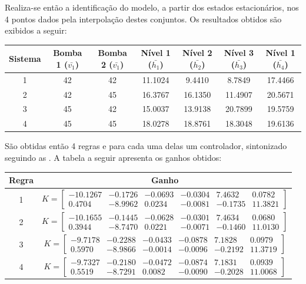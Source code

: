 Realiza-se então a identificação do modelo, a partir dos estados estacionários, nos 4 pontos dados pela interpolação destes conjuntos. Os resultados obtidos são exibidos a seguir:

\begin{center}
	\begin{tabular}{|c|c|c|c|c|c|c|}
		\hline
		Sistema & Bomba 1 ($\bar{v_1}$) & Bomba 2 ($\bar{v_1}$) & Nível 1 ($\bar{h_1}$) & Nível 2 ($\bar{h_2}$) & Nível 3 ($\bar{h_3}$) & Nível 1 ($\bar{h_4}$) \\ \hline
		1 & 42 & 42 & 11.1024 &   9.4410  &  8.7849 &  17.4466 \\ \hline
		2 & 42 & 45 & 16.3767 &  16.1350  & 11.4907 &  20.5671 \\ \hline
		3 & 45 & 42 & 15.0037 &  13.9138  & 20.7899 &  19.5759 \\ \hline
		4 & 45 & 45 & 18.0278 &  18.8761  & 18.3048 &  19.6136 \\	\hline
	\end{tabular}
\end{center}

São obtidas então 4 regras e para cada uma delas um controlador, sintonizado seguindo as . A tabela a seguir apresenta os ganhos obtidos:
\begin{center} \label{tabGanhosReais}
	\begin{tabular}{|c|c|}
		\hline
		Regra & Ganho \\ \hline
		1 & $ K = 
		\begin{bmatrix}
			-10.1267 &  -0.1726 & -0.0693 &  -0.0304 & 7.4632  &  0.0782 \\
			0.4704   & -8.9962  &  0.0234 &  -0.0081 & -0.1735 & 11.3821
		\end{bmatrix}$ \\[10pt] \hline
		2 & $ K = 
		\begin{bmatrix}
			-10.1655 &  -0.1445 &  -0.0628 &  -0.0301 &  7.4634 & 0.0680 \\
			0.3944   & -8.7470  &  0.0221  & -0.0071  & -0.1460 & 11.0130
		\end{bmatrix}$ \\[10pt] \hline
		3 & $ K = 
		\begin{bmatrix}
			-9.7178 &  -0.2288 &  -0.0433 &  -0.0878 &   7.1828 &   0.0979 \\
			0.5970  & -8.9866  & -0.0014  & -0.0096  & -0.2192  & 11.3719
		\end{bmatrix}$ \\[10pt] \hline
		4 & $ K = 
		\begin{bmatrix}
			-9.7327 &  -0.2180 &  -0.0472 &  -0.0874 &   7.1831 &   0.0939 \\
			0.5519  & -8.7291  &  0.0082  & -0.0090  & -0.2028  & 11.0068
		\end{bmatrix}$ \\[10pt] \hline
	\end{tabular}
\end{center}

